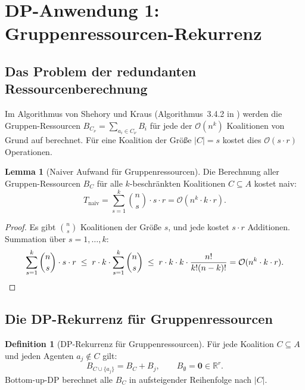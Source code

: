 ﻿\documentclass[a4paper,12pt]{article}
\theoremstyle{definition}
\newtheorem{definition}{Definition}
\newtheorem{lemma}{Lemma}
\begin{document}
\section{DP-Anwendung 1: Gruppenressourcen-Rekurrenz}

\subsection{Das Problem der redundanten Ressourcenberechnung}

Im Algorithmus von Shehory und Kraus (Algorithmus~3.4.2 in \cite{sk98}) werden
die Gruppen-Ressourcen $B_{C_\nu} = \sum_{a_i \in C_\nu} B_i$ f\"{u}r jede der
$\mathcal{O}(n^k)$ Koalitionen von Grund auf berechnet. F\"{u}r eine Koalition
der Gr\"{o}{\ss}e $|C| = s$ kostet dies $\mathcal{O}(s \cdot r)$ Operationen.

\begin{lemma}[Naiver Aufwand f\"{u}r Gruppenressourcen]
    \label{lemma:naive_cost}
    Die Berechnung aller Gruppen-Ressourcen $B_C$ f\"{u}r alle
    $k$-beschr\"{a}nkten Koalitionen $C \subseteq A$ kostet naiv:
    \[
        T_{\mathrm{naiv}} = \sum_{s=1}^k \binom{n}{s} \cdot s \cdot r
        = \mathcal{O}(n^k \cdot k \cdot r).
    \]
\end{lemma}

\begin{proof}
    Es gibt $\binom{n}{s}$ Koalitionen der Gr\"{o}{\ss}e $s$, und jede kostet
    $s \cdot r$ Additionen. Summation \"{u}ber $s = 1, \ldots, k$:
    \[
        \sum_{s=1}^k \binom{n}{s} \cdot s \cdot r
        \;\leq\; r \cdot k \cdot \sum_{s=1}^k \binom{n}{s}
        \;\leq\; r \cdot k \cdot k \cdot \frac{n!}{k!(n-k)!}
        = \mathcal{O}(n^k \cdot k \cdot r). \qedhere
    \]
\end{proof}

\subsection{Die DP-Rekurrenz f\"{u}r Gruppenressourcen}

\begin{definition}[DP-Rekurrenz f\"{u}r Gruppenressourcen]
    F\"{u}r jede Koalition $C \subseteq A$ und jeden Agenten $a_j \notin C$ gilt:
    \begin{equation}
        B_{C \cup \{a_j\}} = B_C + B_j, \qquad B_\emptyset = \mathbf{0} \in \mathbb{R}^r.
        \label{eq:res_recur}
    \end{equation}
    Bottom-up-DP berechnet alle $B_C$ in aufsteigender Reihenfolge nach $|C|$.
\end{definition}
\end{document}
